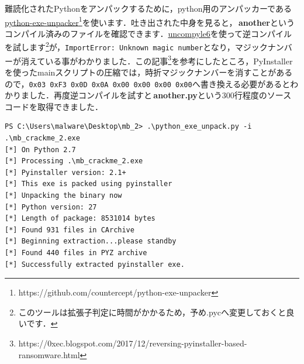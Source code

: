 難読化されたPythonをアンパックするために，python用のアンパッカーである\href{https://github.com/countercept/python-exe-unpacker}{python-exe-unpacker}\footnote{https://github.com/countercept/python-exe-unpacker}を使います．吐き出された中身を見ると，\faCogs \,\textbf{another}というコンパイル済みのファイルを確認できます．\href{https://github.com/rocky/python-uncompyle6}{uncompyle6}を使って逆コンパイルを試します\footnote{このツールは拡張子判定に時間がかかるため，予め.pycへ変更しておくと良いです．}が，\texttt{ImportError: Unknown magic number}となり，マジックナンバーが消えている事がわかりました．この記事\footnote{https://0xec.blogspot.com/2017/12/reversing-pyinstaller-based-ransomware.html}を参考にしたところ，PyInstallerを使ったmainスクリプトの圧縮では，時折マジックナンバーを消すことがあるので，\texttt{0x03 0xF3 0x0D 0x0A 0x00 0x00 0x00 0x00}へ書き換える必要があるとわかりました．再度逆コンパイルを試すと\faFileCodeO \,\textbf{another.py}という300行程度のソースコードを取得できました．

\begin{tcolorbox}[title=アンパック, sharp corners, left=2mm]\scriptsize
\begin{verbatim}
PS C:\Users\malware\Desktop\mb_2> .\python_exe_unpack.py -i .\mb_crackme_2.exe
[*] On Python 2.7
[*] Processing .\mb_crackme_2.exe
[*] Pyinstaller version: 2.1+
[*] This exe is packed using pyinstaller
[*] Unpacking the binary now
[*] Python version: 27
[*] Length of package: 8531014 bytes
[*] Found 931 files in CArchive
[*] Beginning extraction...please standby
[*] Found 440 files in PYZ archive
[*] Successfully extracted pyinstaller exe.
\end{verbatim}
\end{tcolorbox}

